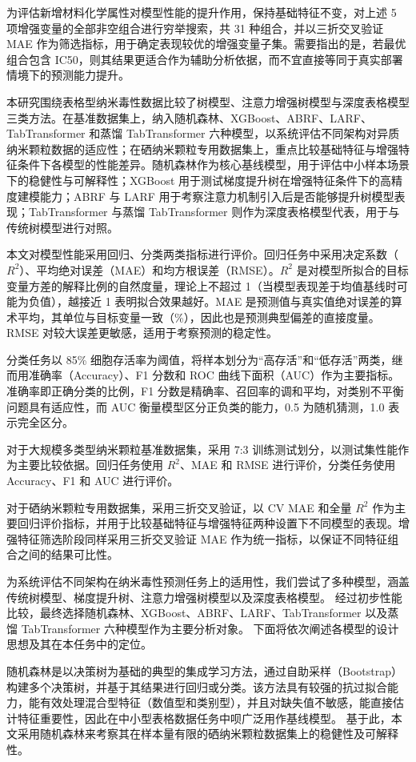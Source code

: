 为评估新增材料化学属性对模型性能的提升作用，保持基础特征不变，对上述 5 项增强变量的全部非空组合进行穷举搜索，共 31 种组合，并以三折交叉验证 MAE 作为筛选指标，用于确定表现较优的增强变量子集。需要指出的是，若最优组合包含 IC50，则其结果更适合作为辅助分析依据，而不宜直接等同于真实部署情境下的预测能力提升。

本研究围绕表格型纳米毒性数据比较了树模型、注意力增强树模型与深度表格模型三类方法。在基准数据集上，纳入随机森林、XGBoost、ABRF、LARF、TabTransformer 和蒸馏 TabTransformer 六种模型，以系统评估不同架构对异质纳米颗粒数据的适应性；在硒纳米颗粒专用数据集上，重点比较基础特征与增强特征条件下各模型的性能差异。随机森林作为核心基线模型，用于评估中小样本场景下的稳健性与可解释性；XGBoost 用于测试梯度提升树在增强特征条件下的高精度建模能力；ABRF 与 LARF 用于考察注意力机制引入后是否能够提升树模型表现；TabTransformer 与蒸馏 TabTransformer 则作为深度表格模型代表，用于与传统树模型进行对照。

本文对模型性能采用回归、分类两类指标进行评价。回归任务中采用决定系数（\(R^2\)）、平均绝对误差（MAE）和均方根误差（RMSE）。\(R^2\) 是对模型所拟合的目标变量方差的解释比例的自然度量，理论上不超过 1（当模型表现差于均值基线时可能为负值），越接近 1 表明拟合效果越好。MAE 是预测值与真实值绝对误差的算术平均，其单位与目标变量一致（\%），因此也是预测典型偏差的直接度量。RMSE 对较大误差更敏感，适用于考察预测的稳定性。

分类任务以 85\% 细胞存活率为阈值，将样本划分为“高存活”和“低存活”两类，继而用准确率（Accuracy）、F1 分数和 ROC 曲线下面积（AUC）作为主要指标。准确率即正确分类的比例，F1 分数是精确率、召回率的调和平均，对类别不平衡问题具有适应性，而 AUC 衡量模型区分正负类的能力，0.5 为随机猜测，1.0 表示完全区分。

对于大规模多类型纳米颗粒基准数据集，采用 7:3 训练测试划分，以测试集性能作为主要比较依据。回归任务使用 $R^2$、MAE 和 RMSE 进行评价，分类任务使用 Accuracy、F1 和 AUC 进行评价。

对于硒纳米颗粒专用数据集，采用三折交叉验证，以 CV MAE 和全量 $R^2$ 作为主要回归评价指标，并用于比较基础特征与增强特征两种设置下不同模型的表现。增强特征筛选阶段同样采用三折交叉验证 MAE 作为统一指标，以保证不同特征组合之间的结果可比性。

为系统评估不同架构在纳米毒性预测任务上的适用性，我们尝试了多种模型，涵盖传统树模型、梯度提升树、注意力增强树模型以及深度表格模型。
经过初步性能比较，最终选择随机森林、XGBoost、ABRF、LARF、TabTransformer 以及蒸馏 TabTransformer 六种模型作为主要分析对象。
下面将依次阐述各模型的设计思想及其在本任务中的定位。

随机森林是以决策树为基础的典型的集成学习方法，通过自助采样（Bootstrap）构建多个决策树，并基于其结果进行回归或分类。该方法具有较强的抗过拟合能力，能有效处理混合型特征（数值型和类别型），并且对缺失值不敏感，能直接估计特征重要性，因此在中小型表格数据任务中呗广泛用作基线模型。
基于此，本文采用随机森林来考察其在样本量有限的硒纳米颗粒数据集上的稳健性及可解释性。


